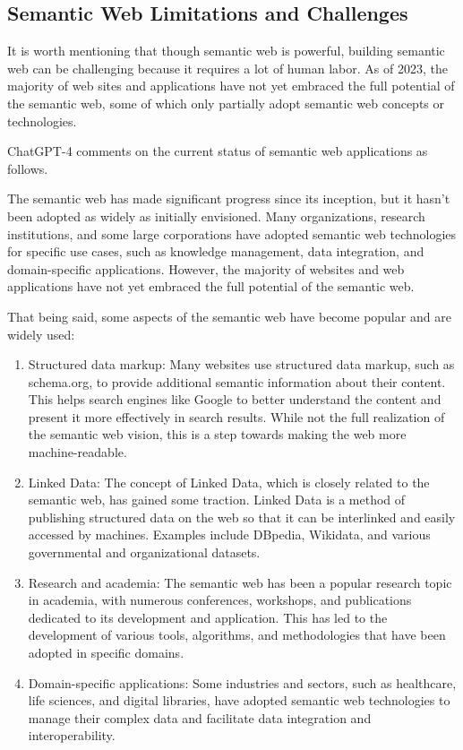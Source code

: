 \subsection{Semantic Web Limitations and Challenges}

It is worth mentioning that though semantic web is powerful, building semantic web can be challenging because it requires a lot of human labor. As of 2023, the majority of web sites and applications have not yet embraced the full potential of the semantic web, some of which only partially adopt semantic web concepts or technologies.

ChatGPT-4 comments on the current status of semantic web applications as follows.

\begin{mdframed}
The semantic web has made significant progress since its inception, but it hasn't been adopted as widely as initially envisioned. Many organizations, research institutions, and some large corporations have adopted semantic web technologies for specific use cases, such as knowledge management, data integration, and domain-specific applications. However, the majority of websites and web applications have not yet embraced the full potential of the semantic web.

That being said, some aspects of the semantic web have become popular and are widely used:

\begin{enumerate}
  \item Structured data markup: Many websites use structured data markup, such as schema.org, to provide additional semantic information about their content. This helps search engines like Google to better understand the content and present it more effectively in search results. While not the full realization of the semantic web vision, this is a step towards making the web more machine-readable.
  \item Linked Data: The concept of Linked Data, which is closely related to the semantic web, has gained some traction. Linked Data is a method of publishing structured data on the web so that it can be interlinked and easily accessed by machines. Examples include DBpedia, Wikidata, and various governmental and organizational datasets.
  \item Research and academia: The semantic web has been a popular research topic in academia, with numerous conferences, workshops, and publications dedicated to its development and application. This has led to the development of various tools, algorithms, and methodologies that have been adopted in specific domains.
  \item Domain-specific applications: Some industries and sectors, such as healthcare, life sciences, and digital libraries, have adopted semantic web technologies to manage their complex data and facilitate data integration and interoperability.
\end{enumerate}


\end{mdframed}
